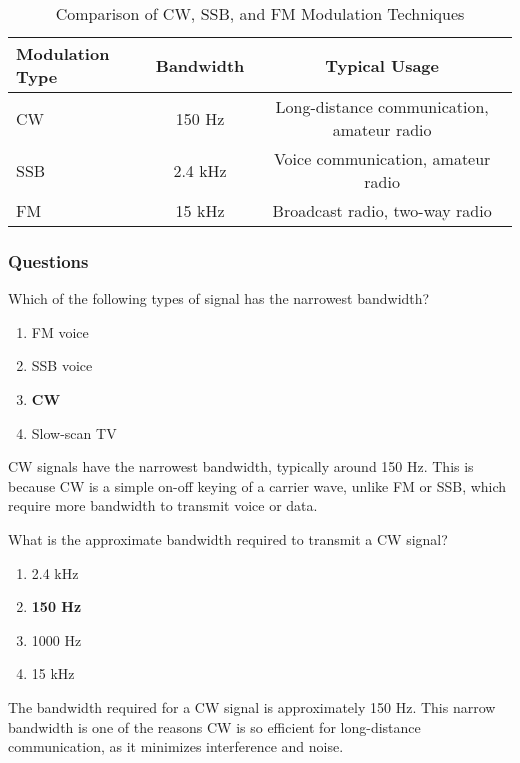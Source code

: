 \begin{table}[h]
    \centering
    \begin{tabular}{|l|c|c|}
        \hline
        \textbf{Modulation Type} & \textbf{Bandwidth} & \textbf{Typical Usage} \\
        \hline
        CW & 150 Hz & Long-distance communication, amateur radio \\
        SSB & 2.4 kHz & Voice communication, amateur radio \\
        FM & 15 kHz & Broadcast radio, two-way radio \\
        \hline
    \end{tabular}
    \caption{Comparison of CW, SSB, and FM Modulation Techniques}
    \label{tab:cw-comparison}
\end{table}

\subsubsection*{Questions}

\begin{tcolorbox}[colback=gray!10!white,colframe=black!75!black,title={T8A05}]
    Which of the following types of signal has the narrowest bandwidth?
    \begin{enumerate}[label=\Alph*),noitemsep]
        \item FM voice
        \item SSB voice
        \item \textbf{CW}
        \item Slow-scan TV
    \end{enumerate}
\end{tcolorbox}
CW signals have the narrowest bandwidth, typically around 150 Hz. This is because CW is a simple on-off keying of a carrier wave, unlike FM or SSB, which require more bandwidth to transmit voice or data.

\begin{tcolorbox}[colback=gray!10!white,colframe=black!75!black,title={T8A11}]
    What is the approximate bandwidth required to transmit a CW signal?
    \begin{enumerate}[label=\Alph*),noitemsep]
        \item 2.4 kHz
        \item \textbf{150 Hz}
        \item 1000 Hz
        \item 15 kHz
    \end{enumerate}
\end{tcolorbox}
The bandwidth required for a CW signal is approximately 150 Hz. This narrow bandwidth is one of the reasons CW is so efficient for long-distance communication, as it minimizes interference and noise.
